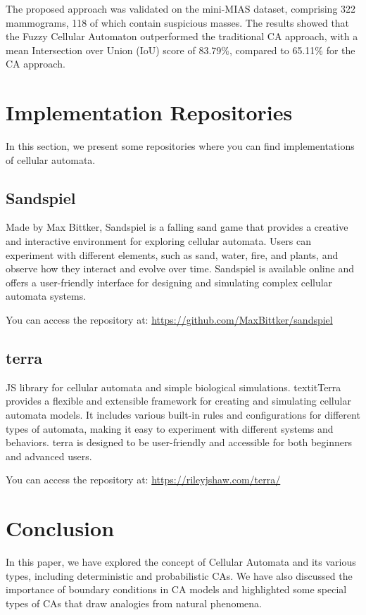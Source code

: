 \documentclass[9pt,a4paper,twoside]{tau-class/tau}
\begin{document}
The proposed approach was validated on the mini-MIAS dataset, comprising 322 mammograms, 118 of which contain suspicious masses. The results showed that the Fuzzy Cellular Automaton outperformed the traditional CA approach, with a mean Intersection over Union (IoU) score of 83.79\%, compared to 65.11\% for the CA approach.



\section{Implementation Repositories}

In this section, we present some repositories where you can find implementations of cellular automata.

\subsection*{Sandspiel}
Made by Max Bittker, Sandspiel is a falling sand game that provides a creative and interactive environment for exploring cellular automata. Users can experiment with different elements, such as sand, water, fire, and plants, and observe how they interact and evolve over time. Sandspiel is available online and offers a user-friendly interface for designing and simulating complex cellular automata systems.

You can access the repository at: \url{https://github.com/MaxBittker/sandspiel}
\subsection*{terra}
JS library for cellular automata and simple biological simulations. textit{Terra} provides a flexible and extensible framework for creating and simulating cellular automata models. It includes various built-in rules and configurations for different types of automata, making it easy to experiment with different systems and behaviors. terra is designed to be user-friendly and accessible for both beginners and advanced users.

You can access the repository at: \url{https://rileyjshaw.com/terra/}
\section{Conclusion}
In this paper, we have explored the concept of Cellular Automata  and its various types, including deterministic and probabilistic CAs. We have also discussed the importance of boundary conditions in CA models and highlighted some special types of CAs that draw analogies from natural phenomena.
\end{document}

